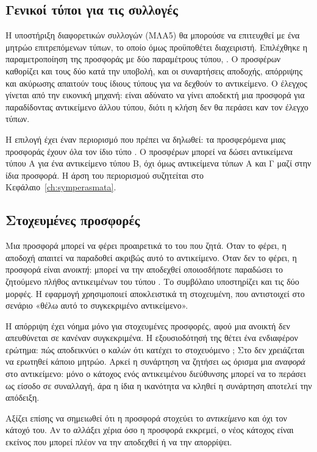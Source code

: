 \subsection{Γενικοί τύποι για τις συλλογές}

Η υποστήριξη διαφορετικών συλλογών (ΜΛΑ5) θα μπορούσε να επιτευχθεί με ένα μητρώο
επιτρεπόμενων τύπων, το οποίο όμως προϋποθέτει διαχειριστή. Επιλέχθηκε η παραμετροποίηση
της προσφοράς με δύο παραμέτρους τύπου, . Ο προσφέρων
καθορίζει και τους δύο κατά την υποβολή, και οι συναρτήσεις αποδοχής, απόρριψης και
ακύρωσης απαιτούν τους ίδιους τύπους για να δεχθούν το αντικείμενο. Ο έλεγχος γίνεται από
την εικονική μηχανή: είναι αδύνατο να γίνει αποδεκτή μια προσφορά για
 παραδίδοντας αντικείμενο άλλου τύπου, διότι η κλήση δεν θα
περάσει καν τον έλεγχο τύπων.

Η επιλογή έχει έναν περιορισμό που πρέπει να δηλωθεί: τα προσφερόμενα  μιας
προσφοράς έχουν όλα τον ίδιο τύπο . Ο προσφέρων μπορεί να δώσει αντικείμενα
τύπου Α για ένα αντικείμενο τύπου Β, όχι όμως αντικείμενα τύπων Α και Γ μαζί στην ίδια
προσφορά. Η άρση του περιορισμού συζητείται στο Κεφάλαιο~\ref{ch:symperasmata}.

\subsection{Στοχευμένες προσφορές}

Μια προσφορά μπορεί να φέρει προαιρετικά το  του  που ζητά. Όταν το φέρει,
η αποδοχή απαιτεί να παραδοθεί ακριβώς αυτό το αντικείμενο. Όταν δεν το φέρει, η προσφορά
είναι \emph{ανοικτή}: μπορεί να την αποδεχθεί οποιοσδήποτε παραδώσει το ζητούμενο πλήθος
αντικειμένων του τύπου . Το συμβόλαιο υποστηρίζει και τις δύο μορφές. Η
εφαρμογή χρησιμοποιεί αποκλειστικά τη στοχευμένη, που αντιστοιχεί στο σενάριο «θέλω αυτό
το συγκεκριμένο αντικείμενο».

Η απόρριψη έχει νόημα μόνο για στοχευμένες προσφορές, αφού μια ανοικτή δεν απευθύνεται σε
κανέναν συγκεκριμένα. Η εξουσιοδότησή της θέτει ένα ενδιαφέρον ερώτημα: πώς αποδεικνύει ο
καλών ότι κατέχει το στοχευόμενο ; Στο  δεν χρειάζεται να ερωτηθεί κάποιο
μητρώο. Αρκεί η συνάρτηση να ζητήσει ως όρισμα μια \emph{αναφορά} στο αντικείμενο: μόνο ο
κάτοχος ενός αντικειμένου διεύθυνσης μπορεί να το περάσει ως είσοδο σε συναλλαγή, άρα η
ίδια η ικανότητα να κληθεί η συνάρτηση αποτελεί την απόδειξη.

Αξίζει επίσης να σημειωθεί ότι η προσφορά στοχεύει το \emph{αντικείμενο} και όχι τον
κάτοχό του. Αν το  αλλάξει χέρια όσο η προσφορά εκκρεμεί, ο νέος κάτοχος είναι
εκείνος που μπορεί πλέον να την αποδεχθεί ή να την απορρίψει.

